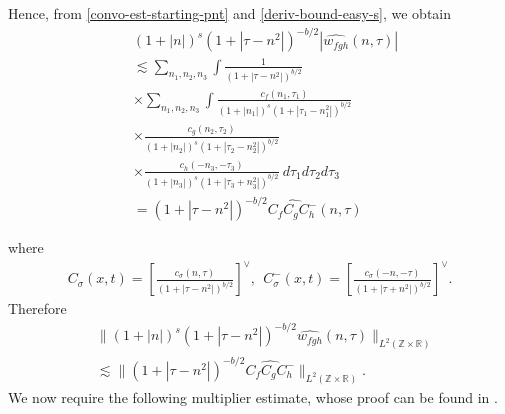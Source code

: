 \documentclass[handout]{beamer}
\numberwithin{equation}{section}
\newcommand{\rr}{\mathbb{R}}
\newcommand{\zz}{\mathbb{Z}}
\newcommand{\wh}{\widehat}
\begin{document}
\begin{frame}

Hence, from \eqref{convo-est-starting-pnt} and \eqref{deriv-bound-easy-s}, we 
obtain
%
\begin{equation*}
	\begin{split}
		& \left(1 + |n| \right)^s \left( 1 +  | \tau - n^{2 }  | \right)^{-b/2} | 
		\wh{w_{fgh}}\left( n, \tau \right) | 
		\\
		& \lesssim \sum_{n_1, n_2,n_3} \int \frac{1}{\left( 1 +
		| \tau - n^{2}| 
		\right)^{b/2}}  
		\\
		& \times
		\sum_{n_1,n_2,n_3} \int \frac{c_f\left( n_1, \tau_1 
		\right)}{\left(1 + |n_1| \right)^s \left( 1 + | \tau_1 - n_1^{2} | \right)^{b/2}}
		\\
		& \times \frac{c_{g}\left( n_2, \tau_2 \right)}{\left(1 + |n_2|  \right) 
		^s\left( 1 + | \tau_2 -  n_2^{2 }| 
		\right)^{b/2}}
		\\
		& \times \frac{c_{h}\left( -n_3, -\tau_3 \right)}{\left(1 + |n_3|
		\right) ^s\left( 1 + | \tau_3 + n_3^{2 } | \right)^{b/2}} \ d \tau_1
		d \tau_2 d \tau_3
		\\
		& = \left( 1 + | \tau - n^{2 } | \right)^{-b/2}
		\wh{C_f C_{g} C^-_{h}} \left( n, \tau \right)
	\end{split}
\end{equation*}
%
%
%
\end{frame}

\begin{frame}

where
%
%
\begin{equation*}
	\begin{split}
		C_\sigma(x, t) = \left[ \frac{c_\sigma\left( n, \tau \right)}{\left( 
		1 + | \tau - n^{2 } | \right)^{b/2}} \right]^\vee,
		\ \ C^-_\sigma(x, t) = \left[ \frac{c_\sigma\left( -n, -\tau \right)}{\left( 
		1 + | \tau + n^{2 } | \right)^{b/2}} \right]^\vee.
	\end{split}
\end{equation*}
%
%
Therefore
%
%
\begin{equation}
	\label{gen-holder-pre-estimate}
	\begin{split}
		& \| \left ( 1 + |n | \right )^s\left( 1 + | \tau - n^{2 } | \right)^{-b/2} \wh{w_{fgh}}(n, 
		\tau)		
		\|_{L^2(\zz \times \rr)}
		 \\
		 & \lesssim \| \left( 1 + | \tau - n^{2 } | \right)^{-b/2}
		\wh{C_f C_{g} C^-_{h}} \|_{L^2(\zz \times \rr)}.
	\end{split}
\end{equation}
%
We now require the following multiplier estimate, whose proof can be found in
\cite{himonas_Misiolek-A-priori-estima}.  
\end{frame}
%
%
%
%
%
%
%
%
\end{document}
